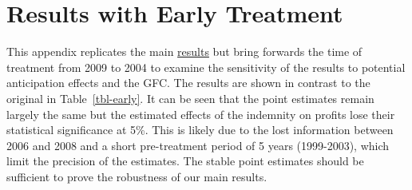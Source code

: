 \documentclass[
  a4paper,
  abstract=true]{scrartcl}
\theoremstyle{definition}
\begin{document}
\newpage

\section{Results with Early Treatment}\label{sec-early}

This appendix replicates the main \hyperref[sec-results]{results} but
bring forwards the time of treatment from 2009 to 2004 to examine the
sensitivity of the results to potential anticipation effects and the
GFC. The results are shown in contrast to the original in
Table~\ref{tbl-early}. It can be seen that the point estimates remain
largely the same but the estimated effects of the indemnity on profits
lose their statistical significance at 5\%. This is likely due to the
lost information between 2006 and 2008 and a short pre-treatment period
of 5 years (1999-2003), which limit the precision of the estimates. The
stable point estimates should be sufficient to prove the robustness of
our main results.
\end{document}
